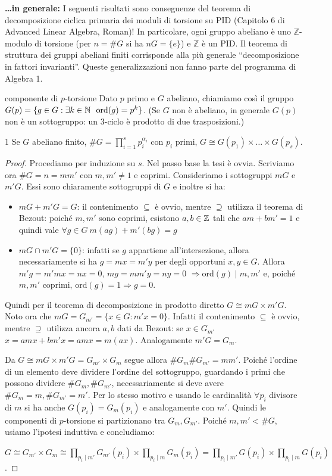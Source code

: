 \textbf{\ldots in generale:} I seguenti risultati sono conseguenze del teorema di decomposizione ciclica primaria dei moduli di torsione su PID (Capitolo 6 di Advanced Linear Algebra, Roman)! In particolare, ogni gruppo abeliano è uno $\mathbb{Z}$-modulo di torsione (per $n = \#G$ si ha $n G = \{e\}$) e $\mathbb{Z}$ è un PID. Il teorema di struttura dei gruppi abeliani finiti corrisponde alla più generale ``decomposizione in fattori invarianti''. Queste generalizzazioni non fanno parte del programma di Algebra 1.

\begin{definition}{componente di $p$-torsione}
    Dato $p$ primo e $G$ abeliano, chiamiamo così il gruppo $G(p) = \{g \in G : \exists k \in \mathbb{N}\ \ \text{ord}(g) = p^k\}$. (Se $G$ non è abeliano, in generale $G(p)$ non è un sottogruppo: un $3$-ciclo è prodotto di due trasposizioni.)
\end{definition}
\begin{theorem}{1}
    Se $G$ abeliano finito, $\#G = \prod_{i = 1}^s p_i^{\alpha_i}$ con $p_i$ primi,  $G \cong G(p_1) \times \dots \times G(p_s)$.
\end{theorem}
\begin{proof}
    Procediamo per induzione su $s$. Nel passo base la tesi è ovvia. Scriviamo ora $\#G = n = mm'$ con $m,m' \neq 1$ e coprimi. Consideriamo i sottogruppi $mG$ e $m'G$. Essi sono chiaramente sottogruppi di $G$ e inoltre si ha:
    \begin{itemize}
        \item $mG + m'G = G$: il contenimento $\subseteq$ è ovvio, mentre $\supseteq$ utilizza il teorema di Bezout: poiché $m,m'$ sono coprimi, esistono $a,b\in \mathbb{Z}$ tali che $am +bm' = 1$ e quindi vale $\forall g \in G \ m(ag) + m'(bg) = g$
        \item $mG \cap m'G = \{0\}$: infatti se $g$ appartiene all'intersezione, allora necessariamente si ha $g = mx = m'y$ per degli opportuni $x,y \in G$. Allora $m'g = m'mx = nx = 0$, $mg = mm'y = ny = 0$ $\Rightarrow \text{ord}(g) \mid m,m'$ e, poiché $m,m'$ coprimi, $\text{ord}(g) = 1 \Rightarrow g = 0$.
    \end{itemize}
    Quindi per il teorema di decomposizione in prodotto diretto $G \cong mG \times m'G$. Noto ora che $mG = G_{m'} = \{x \in G : m'x = 0\}$. Infatti il contenimento $\subseteq$ è ovvio, mentre $\supseteq$ utilizza ancora $a,b$ dati da Bezout: se $x \in G_{m'}$ $x = amx + bm'x = amx = m(ax)$. Analogamente $m'G = G_m$.
    
    Da $G \cong mG \times m'G = G_{m'} \times G_m$ segue allora $\#G_m \#G_{m'} = mm'$. Poiché l'ordine di un elemento deve dividere l'ordine del sottogruppo, guardando i primi che possono dividere $\#G_m, \#G_{m'}$, necessariamente si deve avere $\#G_m=m, \#G_{m'}=m'$. Per lo stesso motivo e usando le cardinalità $\forall p_i$ divisore di $m$ si ha anche $G(p_i) = G_m(p_i)$ e analogamente con $m'$. Quindi le componenti di $p$-torsione si partizionano tra $G_m, G_{m'}$. Poiché $m,m' < \#G$, usiamo l'ipotesi induttiva e concludiamo:
    
    $G \cong G_{m'}\times G_m \cong \prod_{p_i \mid m'} G_{m'}(p_i) \times \prod_{p_i \mid m} G_{m}(p_i) = \prod_{p_i \mid m'} G(p_i) \times \prod_{p_i \mid m} G(p_i)$.
\end{proof}
